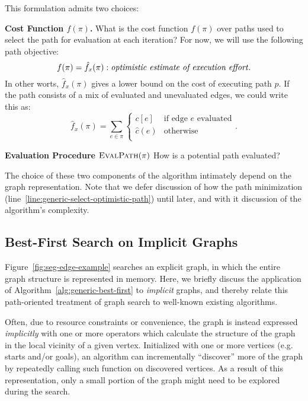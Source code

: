 This formulation admits two choices:

\textbf{Cost Function $f(\pi)$.}
What is the cost function $f(\pi)$ over paths used to select the
path for evaluation at each iteration?
For now, we will use the following path objective:
\begin{equation}
   f(\pi) = \hat{f}_x(\pi): \mbox{\emph{optimistic estimate of execution effort}}.
\end{equation}
In other worts, $\hat{f}_x(\pi)$
gives a lower bound on the cost of executing
path $p$.
If the path consists of a mix of evaluated and unevaluated edges,
we could write this as:
\begin{equation}
   \hat{f}_x(\pi) = \sum_{e \in \pi} \left\{
   \begin{array}{cl}
      c[e] & \mbox{if edge } e \mbox{ evaluated}  \\
      \hat{c}(e) & \mbox{otherwise} \\
   \end{array}
   \right.
   .
   \label{eqn:execution-cost-objective}
\end{equation}

\textbf{Evaluation Procedure $\mbox{\sc EvalPath}(\pi)$}
How is a potential path evaluated?

The choice of these two components of the algorithm
intimately depend on the graph representation.
Note that we defer discussion of how the path minimization
(line~\ref{line:generic-select-optimistic-path}) until later,
and with it discussion of the algorithm's complexity.

\subsection{Best-First Search on Implicit Graphs}
\label{sec:implicit}

Figure~\ref{fig:seg-edge-example} searches an explicit graph,
in which the entire graph structure is represented in memory.
Here, we briefly discuss the application of
Algorithm~\ref{alg:generic-best-first}
to \emph{implicit} graphs,
and thereby relate this path-oriented treatment of graph search
to well-known existing algorithms.

Often, due to resource constraints or convenience,
the graph is instead expressed \emph{implicitly}
with one or more operators which calculate the structure of the graph
in the local vicinity of a given vertex.
Initialized with one or more vertices (e.g. starts and/or goals),
an algorithm can incrementally ``discover'' more of the
graph by repeatedly calling such function on discovered vertices.
As a result of this representation,
only a small portion of the graph might need to be explored
during the search.

